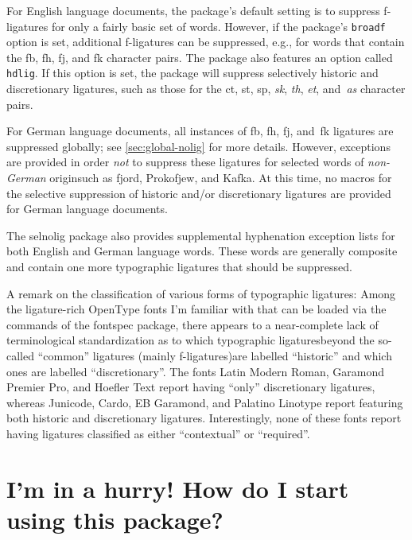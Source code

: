 \documentclass[12pt]{article}
\newcommand{\pkg}[1]{\textsf{#1}}
\newcommand{\opt}[1]{\texttt{#1}}
\begin{document}
For English language documents, the package's default setting is to suppress f-ligatures for only a fairly basic set of words. However, if the package's \opt{broadf} option is set, additional f-ligatures can be suppressed, e.g., for words that contain the {\ebg \mbox{fb}, \mbox{fh}, \mbox{fj}, and \mbox{fk}} character pairs. The package also features an option called \opt{hdlig}. If this option is set, the package will suppress selectively historic and discretionary ligatures, such as those for the ct, st, sp, {\ebg\emph{sk}}, \emph{th}, \emph{et}, and~\emph{as} character pairs. 


For German language documents, all instances of {\ebg \mbox{fb}, \mbox{fh}, \mbox{fj}, and~\mbox{fk}} ligatures are suppressed globally; see \cref{sec:global-nolig} for more details. However, exceptions are provided in order \emph{not} to suppress these ligatures for selected words of \emph{non-German} origin\textemdash such as fjord, Prokofjew, and {\ebg Kafka}. At this time, no macros for the selective suppression of historic and/or discretionary ligatures are provided for German language documents.

The \pkg{selnolig} package also provides supplemental hyphenation exception lists for both English and German language words. These words are generally composite and contain one more typographic ligatures that should be suppressed.

A remark on the classification of various forms of typographic ligatures: Among the ligature-rich OpenType fonts I'm familiar with that can be loaded via the commands of the \pkg{fontspec} package, there appears to a near-complete lack of terminological standardization as to which typographic ligatures\textemdash beyond the so-called \enquote{common} ligatures (mainly f-ligatures)\textemdash are labelled \enquote{historic} and which ones are labelled \enquote{discretionary}. The fonts Latin Modern Roman, Garamond Premier Pro, and Hoefler Text report having \enquote{only} discretionary ligatures, whereas Junicode, Cardo, EB Garamond, and Palatino Linotype report featuring both historic and discretionary ligatures. Interestingly, none of these fonts report having ligatures classified as either \enquote{contextual} or \enquote{required}. 

\section{I'm in a hurry! How do I start using this package?}
\end{document}
